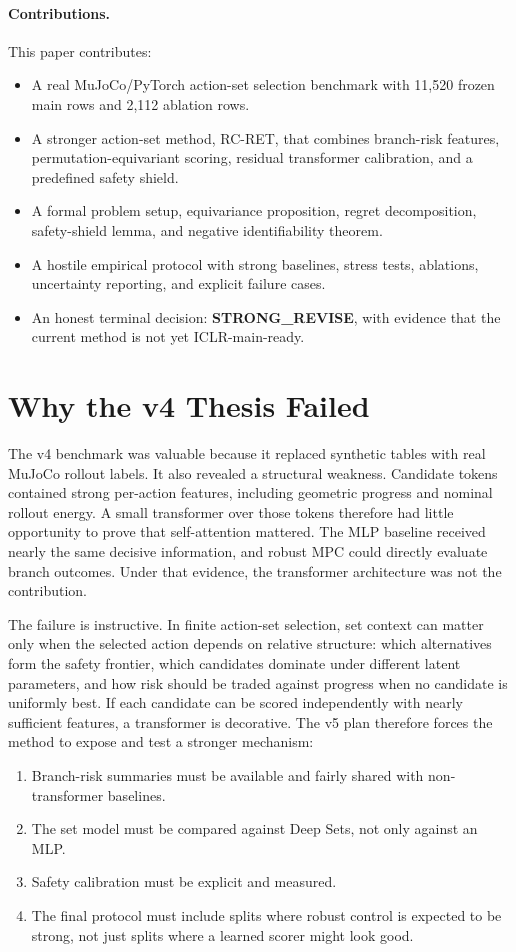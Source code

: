 \documentclass{article}
\newcommand{\method}{RC-RET}
\begin{document}
\paragraph{Contributions.}
This paper contributes:
\begin{itemize}
\item A real MuJoCo/PyTorch action-set selection benchmark with 11,520 frozen main rows and 2,112 ablation rows.
\item A stronger action-set method, \method, that combines branch-risk features, permutation-equivariant scoring, residual transformer calibration, and a predefined safety shield.
\item A formal problem setup, equivariance proposition, regret decomposition, safety-shield lemma, and negative identifiability theorem.
\item A hostile empirical protocol with strong baselines, stress tests, ablations, uncertainty reporting, and explicit failure cases.
\item An honest terminal decision: \textbf{STRONG\_REVISE}, with evidence that the current method is not yet ICLR-main-ready.
\end{itemize}

\section{Why the v4 Thesis Failed}

The v4 benchmark was valuable because it replaced synthetic tables with real MuJoCo rollout labels.  It also revealed a structural weakness.  Candidate tokens contained strong per-action features, including geometric progress and nominal rollout energy.  A small transformer over those tokens therefore had little opportunity to prove that self-attention mattered.  The MLP baseline received nearly the same decisive information, and robust MPC could directly evaluate branch outcomes.  Under that evidence, the transformer architecture was not the contribution.

The failure is instructive.  In finite action-set selection, set context can matter only when the selected action depends on relative structure: which alternatives form the safety frontier, which candidates dominate under different latent parameters, and how risk should be traded against progress when no candidate is uniformly best.  If each candidate can be scored independently with nearly sufficient features, a transformer is decorative.  The v5 plan therefore forces the method to expose and test a stronger mechanism:
\begin{enumerate}
\item Branch-risk summaries must be available and fairly shared with non-transformer baselines.
\item The set model must be compared against Deep Sets, not only against an MLP.
\item Safety calibration must be explicit and measured.
\item The final protocol must include splits where robust control is expected to be strong, not just splits where a learned scorer might look good.
\end{enumerate}
\end{document}
